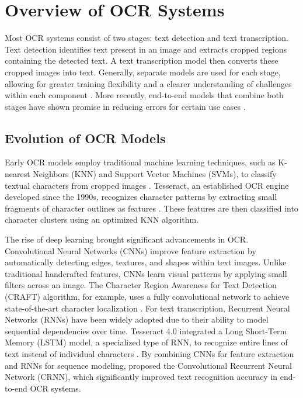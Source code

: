 \documentclass[12pt,oneside]{memoir}
\begin{document}
\section{Overview of OCR Systems}

Most OCR systems consist of two stages: text detection and text transcription.
Text detection identifies text present in an image and extracts cropped regions containing the detected text. 
A text transcription model then converts these cropped images into text.
Generally, separate models are used for each stage, allowing for greater training flexibility and a clearer understanding of challenges within each component \parencite{subramani-etal-2023}. 
More recently, end-to-end models that combine both stages have shown promise in reducing errors for certain use cases \parencite{feng-etal-2019}.

\subsection{Evolution of OCR Models}

Early OCR models employ traditional machine learning techniques, such as K-nearest Neighbors (KNN) and Support Vector Machines (SVMs), to classify textual characters from cropped images \parencite{ghadekar-etal-2018}.
Tesseract, an established OCR engine developed since the 1990s, recognizes character patterns by extracting small fragments of character outlines as features \parencite{smith-2013}.
These features are then classified into character clusters using an optimized KNN algorithm.

The rise of deep learning brought significant advancements in OCR.
Convolutional Neural Networks (CNNs) improve feature extraction by automatically detecting edges, textures, and shapes within text images.
Unlike traditional handcrafted features, CNNs learn visual patterns by applying small filters across an image. 
The Character Region Awareness for Text Detection (CRAFT) algorithm, for example, uses a fully convolutional network to achieve state-of-the-art character localization \parencite{baek-etal-2019}.
For text transcription, Recurrent Neural Networks (RNNs) have been widely adopted due to their ability to model sequential dependencies over time.
Tesseract 4.0 integrated a Long Short-Term Memory (LSTM) model, a specialized type of RNN, to recognize entire lines of text instead of individual characters \parencite{tesseract-2025}.
By combining CNNs for feature extraction and RNNs for sequence modeling, \textcite{shi-etal-2015} proposed the Convolutional Recurrent Neural Network (CRNN), which significantly improved text recognition accuracy in end-to-end OCR systems.
\end{document}
